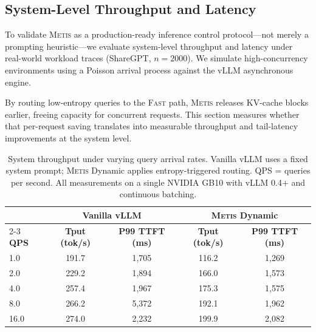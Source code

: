 \documentclass[11pt,a4paper]{article}
\newcommand{\metis}{\textsc{Metis}}
\begin{document}
\subsection{System-Level Throughput and Latency}
\label{sec:system}

To validate \metis{} as a production-ready inference control protocol---not merely a prompting heuristic---we evaluate system-level throughput and latency under real-world workload traces (ShareGPT, $n{=}2000$). We simulate high-concurrency environments using a Poisson arrival process against the vLLM asynchronous engine.

By routing low-entropy queries to the \textsc{Fast} path, \metis{} releases KV-cache blocks earlier, freeing capacity for concurrent requests. This section measures whether that per-request saving translates into measurable throughput and tail-latency improvements at the system level.

\begin{table}[ht]
\centering
\caption{System throughput under varying query arrival rates. Vanilla vLLM uses a fixed system prompt; \metis{} Dynamic applies entropy-triggered routing. QPS = queries per second. All measurements on a single NVIDIA GB10 with vLLM 0.4+ and continuous batching.}
\label{tab:throughput}
\small
\begin{tabular}{@{}lcccc@{}}
\toprule
& \multicolumn{2}{c}{\textbf{Vanilla vLLM}} & \multicolumn{2}{c}{\textbf{\metis{} Dynamic}} \\
\cmidrule{2-3} \cmidrule{4-5}
\textbf{QPS} & \textbf{Tput (tok/s)} & \textbf{P99 TTFT (ms)} & \textbf{Tput (tok/s)} & \textbf{P99 TTFT (ms)} \\
\midrule
1.0  & 191.7 & 1{,}705 & 116.2 & 1{,}269 \\
2.0  & 229.2 & 1{,}894 & 166.0 & 1{,}573 \\
4.0  & 257.4 & 1{,}967 & 175.3 & 1{,}575 \\
8.0  & 266.2 & 5{,}372 & 192.1 & 1{,}962 \\
16.0 & 274.0 & 2{,}232 & 199.9 & 2{,}082 \\
\bottomrule
\end{tabular}
\end{table}
\end{document}
